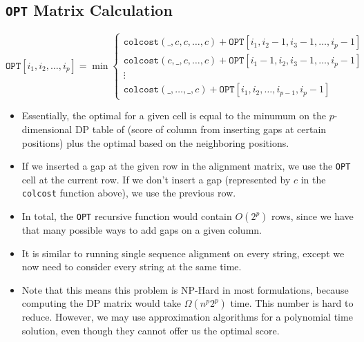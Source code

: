 \documentclass[10pt]{article}
\begin{document}
\subsection*{\texttt{OPT} Matrix Calculation}
\[\texttt{OPT}[i_1, i_2, \dots, i_p] = \min \begin{cases}
\texttt{colcost}(\_, c, c, \dots, c) + \texttt{OPT}[i_1, i_2 - 1, i_3 - 1, \dots, i_p - 1] \\
\texttt{colcost}(c, \_, c, \dots, c) + \texttt{OPT}[i_1 - 1, i_2, i_3 - 1, \dots, i_p - 1] \\
\vdots \\
\texttt{colcost}(\_, \dots, \_, c) + \texttt{OPT}[i_1, i_2, \dots, i_{p - 1}, i_p - 1]
\end{cases}\]

\begin{itemize}
	\item Essentially, the optimal for a given cell is equal to the minumum on the $p$-dimensional DP table of (score of column from inserting gaps at certain positions) plus the optimal based on the neighboring positions.
	\item If we inserted a gap at the given row in the alignment matrix, we use the \texttt{OPT} cell at the current row.  If we don't insert a gap (represented by $c$ in the \texttt{colcost} function above), we use the previous row.
	\item In total, the \texttt{OPT} recursive function would contain $O(2^p)$ rows, since we have that many possible ways to add gaps on a given column.
	\item It is similar to running single sequence alignment on every string, except we now need to consider every string at the same time.
    \item Note that this means this problem is NP-Hard in most formulations, because computing the DP matrix would take $\Omega(n^p 2^p)$ time.  This number is hard to reduce.  However, we may use approximation algorithms for a polynomial time solution, even though they cannot offer us the optimal score.
\end{itemize}
\end{document}
